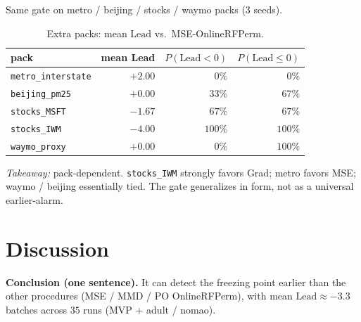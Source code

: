 \documentclass[11pt]{article}
\newcommand{\Lead}{\mathrm{Lead}}
\begin{document}
Same gate on metro / beijing / stocks / waymo packs (3 seeds).

\begin{table}[h]
\centering
\caption{Extra packs: mean $\Lead$ vs.\ MSE-OnlineRFPerm.}
\label{tab:packs}
\begin{tabular}{lrrr}
\toprule
pack & mean Lead & $P(\Lead<0)$ & $P(\Lead\le 0)$ \\
\midrule
\texttt{metro\_interstate} & $+2.00$ & $0\%$   & $0\%$ \\
\texttt{beijing\_pm25}     & $+0.00$ & $33\%$  & $67\%$ \\
\texttt{stocks\_MSFT}      & $-1.67$ & $67\%$  & $67\%$ \\
\texttt{stocks\_IWM}       & $-4.00$ & $100\%$ & $100\%$ \\
\texttt{waymo\_proxy}      & $+0.00$ & $0\%$   & $100\%$ \\
\bottomrule
\end{tabular}
\end{table}

\noindent\textit{Takeaway:} pack-dependent.
\texttt{stocks\_IWM} strongly favors Grad; metro favors MSE;
waymo / beijing essentially tied. The gate generalizes in form, not
as a universal earlier-alarm.

\section{Discussion}
\label{sec:disc}

\noindent\textbf{Conclusion (one sentence).}
It can detect the freezing point earlier than the other procedures
(MSE / MMD / PO OnlineRFPerm), with mean $\Lead\approx -3.3$ batches
across $35$ runs (MVP + adult / nomao).
\end{document}

